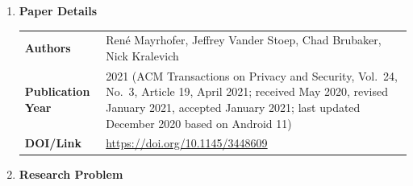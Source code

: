 \documentclass[11pt,a4paper]{article}
\newcommand{\entrypart}[1]{\textbf{\color{accent}#1}\par\vspace{2pt}}
\begin{document}
\begin{enumerate}

    \item \entrypart{Paper Details}

    \begin{tabular}{@{}>{\bfseries}p{3.2cm} p{11.5cm}@{}}
        Authors          & Ren\'{e} Mayrhofer, Jeffrey Vander Stoep, Chad Brubaker, Nick Kralevich \\[2pt]
        Publication Year & 2021 (ACM Transactions on Privacy and Security, Vol.\ 24, No.\ 3, Article 19, April 2021; received May 2020, revised January 2021, accepted January 2021; last updated December 2020 based on Android 11) \\[2pt]
        DOI/Link         & \url{https://doi.org/10.1145/3448609}
    \end{tabular}

    \item \entrypart{Research Problem}


\end{enumerate}
\end{document}
